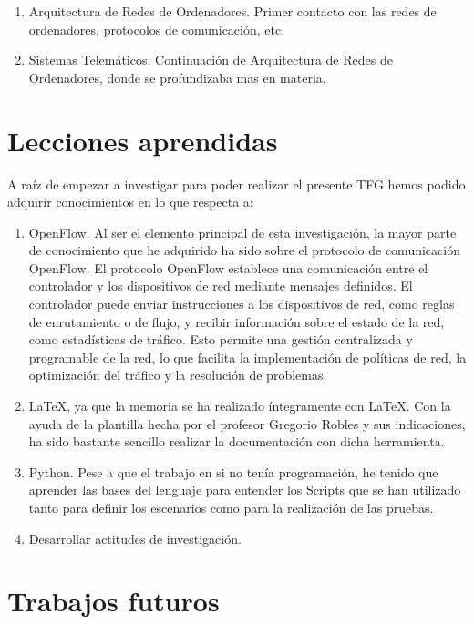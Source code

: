 \documentclass[a4paper, 12pt]{book}
\begin{document}
	\begin{enumerate}
		\item Arquitectura de Redes de Ordenadores. Primer contacto con las redes de ordenadores, protocolos de comunicación, etc.
		\item Sistemas Telemáticos. Continuación de Arquitectura de Redes de Ordenadores, donde se profundizaba mas en materia.
	\end{enumerate}
	
	
	\section{Lecciones aprendidas}
	\label{sec:lecciones_aprendidas}
	
	A raíz de empezar a investigar para poder realizar el presente TFG hemos podido adquirir conocimientos en lo que respecta a:
	
	\begin{enumerate}
		\item OpenFlow. Al ser el elemento principal de esta investigación, la mayor parte de conocimiento que he adquirido ha sido sobre el protocolo de comunicación OpenFlow. El protocolo OpenFlow establece una comunicación entre el controlador y los dispositivos de red mediante mensajes definidos. El controlador puede enviar instrucciones a los dispositivos de red, como reglas de enrutamiento o de flujo, y recibir información sobre el estado de la red, como estadísticas de tráfico. Esto permite una gestión centralizada y programable de la red, lo que facilita la implementación de políticas de red, la optimización del tráfico y la resolución de problemas.
		\item LaTeX, ya que la memoria se ha realizado íntegramente con LaTeX. Con la ayuda de la plantilla hecha por el profesor Gregorio Robles y sus indicaciones, ha sido bastante sencillo realizar la documentación con dicha herramienta.
		\item Python. Pese a que el trabajo en si no tenía programación, he tenido que aprender las bases del lenguaje para entender los Scripts que se han utilizado tanto para definir los escenarios como para la realización de las pruebas.
		\item Desarrollar actitudes de investigación.
		
	\end{enumerate}
	
	
	\section{Trabajos futuros}
	\label{sec:trabajos_futuros}
	
\end{document}
